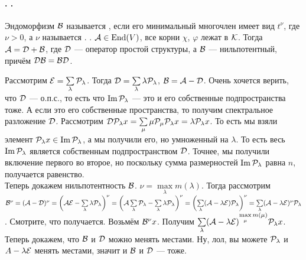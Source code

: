 \documentclass{article}
\DeclareMathOperator{\operIm}{Im}
\let\Im\operIm
\newcommand*{\id}{{\scriptE}}
\begin{document}
    \paragraph{. .}
    \begin{itemize}
        \dfn Эндоморфизм ${\mathcal{B}}$ называется , если его минимальный многочлен имеет вид $t^\nu$, где $\nu>0$, а $\nu$ называется .
        \thm {}. ${\mathcal{A}}\in\operatorname{End}(V)$, все корни $\chi$, $\varphi$ лежат в ${\mathcal{K}}$. Тогда ${\mathcal{A}}={\mathcal{D}}+{\mathcal{B}}$, где ${\mathcal{D}}$ --- оператор простой структуры, а ${\mathcal{B}}$ --- нильпотентный, причём ${\mathcal{D}}{\mathcal{B}}={\mathcal{B}}{\mathcal{D}}$.
        \begin{Proof}
            Рассмотрим $\id=\sum\limits_{\lambda}\scriptP_\lambda$. Тогда ${\mathcal{D}}=\sum\limits_{\lambda}\lambda{\mathcal{P}}_\lambda$, ${\mathcal{B}}={\mathcal{A}}-{\mathcal{D}}$. Очень хочется верить, что ${\mathcal{D}}$ --- о.п.с., то есть что $\Im\scriptP_\lambda$ --- это и его собственные подпространства тоже. А если это его собственные пространства, то получим спектральное разложение ${\mathcal{D}}$. Рассмотрим ${\mathcal{D}}{\mathcal{P}}_\lambda x=\sum\limits_{\mu}\mu{\mathcal{P}}_\mu{\mathcal{P}}_\lambda x=\lambda{\mathcal{P}}_\lambda x$. То есть мы взяли элемент $\scriptP_\lambda x\in\Im\scriptP_\lambda$, а мы получили его, но умноженный на $\lambda$. То есть весь $\Im\scriptP_\lambda$ является собственным подпространством ${\mathcal{D}}$. Точнее, мы получили включение первого во второе, но поскольку сумма размерностей $\Im\scriptP_\lambda$ равна $n$, получается равенство.\\
            Теперь докажем нильпотентность ${\mathcal{B}}$. $\nu=\max\limits_{\lambda}m(\lambda)$. Тогда рассмотрим $\scriptB^\nu=(\scriptA-\scriptD)^\nu=\left(\scriptA\id-\sum\limits_{\lambda}\lambda\scriptP_\lambda\right)^\nu=\left(\scriptA\sum\limits_{\lambda}\scriptP_\lambda-\sum\limits_{\lambda}\lambda\scriptP_\lambda\right)^\nu=
            \left(\sum\limits_{\lambda}(\scriptA-\lambda\id)\scriptP_\lambda\right)^\nu=\sum\limits_{\lambda}(\scriptA-\lambda\id)^\nu\scriptP_\lambda$. Смотрите, что получается. Возьмём ${\mathcal{B}}^\nu x$. Получим $\sum\limits_{\lambda}(\scriptA-\lambda\id)^{\max\limits_{\mu}m(\mu)}\scriptP_\lambda x$.\\
            Теперь докажем, что ${\mathcal{B}}$ и ${\mathcal{D}}$ можно менять местами. Ну, лол, вы можете ${\mathcal{P}}_\lambda$ и $A-\lambda\id$ менять местами, значит и ${\mathcal{B}}$ и ${\mathcal{D}}$ --- тоже.

\end{Proof}
\end{itemize}
\end{document}
